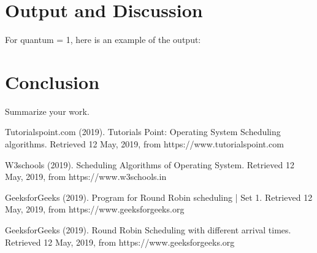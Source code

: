 \documentclass[12pt]{article}
\begin{document}
\newpage
\section{Output and Discussion}

For quantum = 1, here is an example of the output:



\newpage
\section{Conclusion}
Summarize your work.


\newpage



Tutorialspoint.com (2019). Tutorials Point: Operating System Scheduling
algorithms. Retrieved 12 May, 2019, from https://www.tutorialspoint.com

W3schools (2019). Scheduling Algorithms of Operating System. Retrieved 12 May,
2019, from https://www.w3schools.in

GeeksforGeeks (2019). Program for Round Robin scheduling | Set 1. Retrieved 12
May, 2019, from https://www.geeksforgeeks.org

GeeksforGeeks (2019). Round Robin Scheduling with different arrival times.
Retrieved 12 May, 2019, from https://www.geeksforgeeks.org
\end{document}
